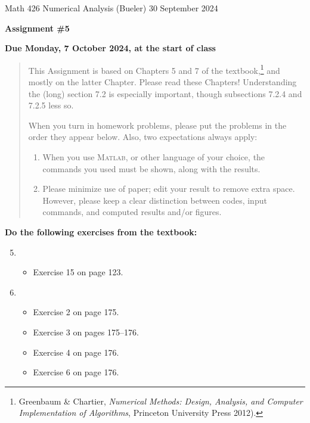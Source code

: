 \documentclass[12pt]{amsart}
\newcommand{\Matlab}{\textsc{Matlab}\xspace}
\begin{document}
\scriptsize \noindent Math 426 Numerical Analysis (Bueler) \hfill 30 September 2024
\normalsize

\medskip\bigskip

\Large\centerline{\textbf{Assignment \#5}}
\large
\bigskip

\centerline{\textbf{Due Monday, 7 October 2024, at the start of class}}
\medskip
\normalsize

\thispagestyle{empty}

\begin{quote}
{\small
This Assignment is based on Chapters 5 and 7 of the textbook,\footnote{Greenbaum \& Chartier, \emph{Numerical Methods: Design, Analysis, and Computer Implementation of Algorithms}, Princeton University Press 2012).} and mostly on the latter Chapter.  Please read these Chapters!  Understanding the (long) section 7.2 is especially important, though subsections 7.2.4 and 7.2.5 less so.

\medskip
\noindent When you turn in homework problems, please put the problems in the order they appear below.  Also, two expectations always apply:
\renewcommand{\labelenumi}{\arabic{enumi}.\,}
\begin{enumerate}
\item When you use \Matlab, or other language of your choice, the commands you used must be shown, along with the results.
\item Please minimize use of paper; edit your result to remove extra space.  However, please keep a clear distinction between codes, input commands, and computed results and/or figures.
\end{enumerate}
}
\end{quote}

\bigskip
\noindent \textbf{Do the following exercises from the textbook:}

\medskip
\renewcommand{\labelenumi}{{\footnotesize\underline{\textsc{Chapter \arabic{enumi}}}}}
\begin{enumerate}
\setcounter{enumi}{4}
\item ~
    \begin{itemize}
    \item Exercise 15 on page 123.
    \end{itemize}
\setcounter{enumi}{6}
\item ~
    \begin{itemize}
    \item Exercise 2 on page 175.
    \item Exercise 3 on pages 175--176.
    \item Exercise 4 on page 176.
    \item Exercise 6 on page 176.
    \end{itemize}
\end{enumerate}
\end{document}
